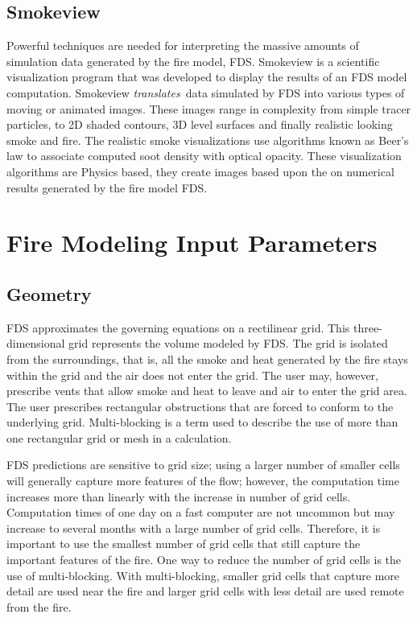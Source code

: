 \documentclass[11pt]{book}
\begin{document}
\subsection{Smokeview}
Powerful techniques are needed for interpreting the massive amounts of simulation data generated by the fire model, FDS.  Smokeview is a scientific visualization program that was developed to display the results of an FDS model computation. Smokeview {\em translates}\ data simulated by FDS into various types of moving or animated images.  These images range in complexity from simple tracer particles, to 2D shaded contours, 3D level surfaces and finally realistic looking smoke and fire.  The realistic smoke visualizations use algorithms known as Beer's law to associate computed soot density with optical opacity.  These visualization algorithms are Physics based, they create images based upon the on numerical results generated by the fire model FDS.

\section{Fire Modeling Input Parameters}

\subsection{Geometry}
FDS approximates the governing equations on a rectilinear grid. This three-dimensional grid represents the volume modeled by FDS. The grid is isolated from the surroundings, that is, all the smoke and heat generated by the fire stays within the grid and the air does not enter the grid. The user may, however, prescribe vents that allow smoke and heat to leave and air to enter the grid area. The user prescribes rectangular obstructions that are forced to conform to the underlying grid. Multi-blocking is a term used to describe the use of more than one rectangular grid or mesh in a calculation.

FDS predictions are sensitive to grid size; using a larger number of smaller cells will generally capture more features of the flow; however, the computation time increases more than linearly with the increase in number of grid cells. Computation times of one day on a fast computer are not uncommon but may increase to several months with a large number of grid cells. Therefore, it is important to use the smallest number of grid cells that still capture the important features of the fire. One way to reduce the number of grid cells is the use of multi-blocking. With multi-blocking, smaller grid cells that capture more detail are used near the fire and larger grid cells with less detail are used remote from the fire.
\end{document}
